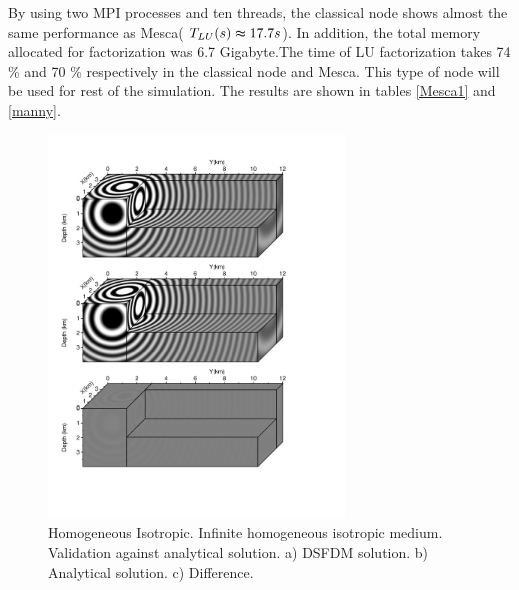 By using two MPI processes and ten threads, the classical node shows almost the same performance as Mesca(
 $T_{LU}(s)\thickapprox 17.7 s$). In addition, the total memory allocated for factorization was  6.7 Gigabyte.The time of LU factorization takes 74 \% and 70 \% respectively in the classical node and Mesca. This type of node will be used for rest of the simulation. The results are shown in tables \ref{Mesca1} and \ref{manny}. \newline
\begin{figure}
\centering 
\includegraphics[width=0.7\textwidth]{images/fig_dsfdm/fig_cube_homogeneous_isotropic.pdf}
\caption{Homogeneous Isotropic. Infinite homogeneous isotropic medium. Validation against analytical
solution. a) DSFDM solution. b) Analytical solution. c) Difference.}
\label{cube_homogeneous_isotropic} 

\end{figure}
